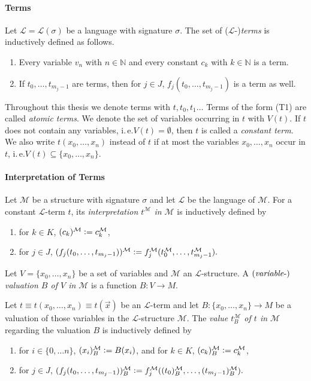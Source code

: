 \paragraph{Terms}
Let $\mathcal{L}=\mathcal{L}(\sigma)$ be a language with signature $\sigma $. The set of ($\mathcal{L}$-)\textit{terms} is inductively defined as follows.
\begin{enumerate}[label=({T\arabic*})]
\item Every variable $v_n$ with $n \in \mathbb{N}$ and every constant $c_k$ with $k \in \mathbb{N}$ is a term.
\item If $t_0, \ldots, t_{m_{j}-1 }$ are terms, then for $j \in J$, $f_j (t_0, \ldots, t_{m_{j}-1 } )$ is a term as well.
\end{enumerate}

Throughout this thesis we denote terms with $t,t_0,t_1\ldots$ Terms of the form (T1) are called \textit{atomic terms}. We denote the set of variables occurring in $t$ with $V(t)$. If $t$ does not contain any variables, i.\,e.\@ $V(t) = \emptyset$, then $t$ is called a \textit{constant term}. We also write $t(x_0, \ldots, x_{n})$ instead of $t$ if at most the variables $x_0, \ldots, x_n$ occur in $t$, i.\,e.\@ $V(t) \subseteq \lbrace x_0, \ldots, x_n \rbrace$.

\paragraph{Interpretation of Terms}
Let $\mathcal{M}$ be a structure with signature $\sigma$ and let $\mathcal{L}$ be the language of $\mathcal{M}$. For a constant $\mathcal{L}$-term $t$, its \textit{interpretation $t^\mathcal{M}$ in $\mathcal{M}$} is inductively defined by
\begin{enumerate}
\item for $k \in K$, $(c_k)^\mathcal{M} \vcentcolon= c_k^\mathcal{M}$,
\item for $j \in J$, $(f_j(t_0, \ldots, t_{m_j-1}))^\mathcal{M} \vcentcolon= f_j^\mathcal{M}(t_0^\mathcal{M}, \ldots, t_{m_j-1}^\mathcal{M}).$
\end{enumerate} 

Let $V = \lbrace x_0, \ldots, x_n \rbrace$ be a set of variables and $\mathcal{M}$ an $\mathcal{L}$-structure. A $\text{(\textit{variable}-)}$\textit{valuation $B$ of $V$ in $\mathcal{M}$} is a function $B : V \rightarrow M$.

Let $t \equiv t(x_0, \ldots, x_n)\equiv t(\overrightarrow{x}) $ be an $\mathcal{L}$-term and let $B : \lbrace x_0,\ldots, x_n \rbrace \rightarrow M $ be a valuation of those variables in the $\mathcal{L}$-structure $\mathcal{M}$. The \textit{value $t_B^\mathcal{M}$ of $t$ in $\mathcal{M}$} regarding the valuation $B$ is inductively defined by
\begin{enumerate}
\item for $i \in \lbrace 0, \ldots n \rbrace$, $(x_i)_B^\mathcal{M} \vcentcolon= B(x_i)$, and for $k \in K$, $(c_k)_B^\mathcal{M} \vcentcolon= c_k^\mathcal{M}$,
\item for $j \in J$, $(f_j(t_0, \ldots, t_{m_j-1}))_B^\mathcal{M} \vcentcolon= f_j^\mathcal{M}((t_0)_B^\mathcal{M}, \ldots, (t_{m_j-1})_B^\mathcal{M}).$
\end{enumerate}

